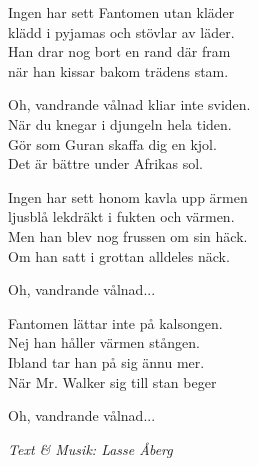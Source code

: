 \vspace{10pt}
Ingen har sett Fantomen utan kläder\\
klädd i pyjamas och stövlar av läder.\\
Han drar nog bort en rand där fram\\
när han kissar bakom trädens stam.\par
\vspace{10pt}
Oh, vandrande vålnad kliar inte sviden.\\
När du knegar i djungeln hela tiden.\\
Gör som Guran skaffa dig en kjol.\\
Det är bättre under Afrikas sol.\par
\vspace{10pt}
Ingen har sett honom kavla upp ärmen\\
ljusblå lekdräkt i fukten och värmen.\\
Men han blev nog frussen om sin häck.\\
Om han satt i grottan alldeles näck.\par
\vspace{10pt}
Oh, vandrande vålnad...\par
\vspace{10pt}
Fantomen lättar inte på kalsongen.\\
Nej han håller värmen stången.\\
Ibland tar han på sig ännu mer.\\
När Mr. Walker sig till stan beger\par
\vspace{10pt}
Oh, vandrande vålnad...
\par
\vspace{10pt}
{\footnotesize\textit{Text \& Musik: Lasse Åberg}}
